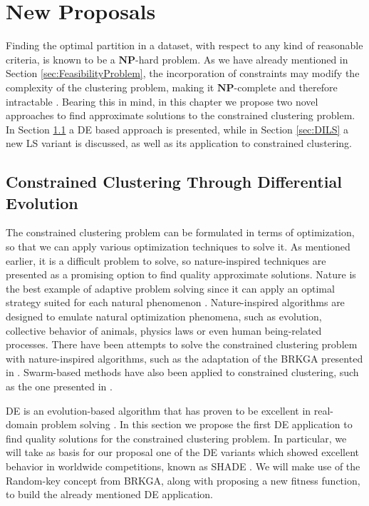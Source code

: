 \chapter{New Proposals}\label{ch:NewProposals}

Finding the optimal partition in a dataset, with respect to any kind of reasonable criteria, is known to be a $\mathbf{NP}$-hard problem. As we have already mentioned in Section \ref{sec:FeasibilityProblem}, the incorporation of constraints may modify the complexity of the clustering problem, making it $\mathbf{NP}$-complete and therefore intractable \cite{davidson2005clustering}. Bearing this in mind, in this chapter we propose two novel approaches to find approximate solutions to the constrained clustering problem. In Section \ref{sec:CCSHADE} a \acf{DE} based approach is presented, while in Section \ref{sec:DILS} a new \acf{LS} variant is discussed, as well as its application to constrained clustering.


\section{Constrained Clustering Through Differential Evolution} \label{sec:CCSHADE}

The constrained clustering problem can be formulated in terms of optimization, so that we can apply various optimization techniques to solve it. As mentioned earlier, it is a difficult problem to solve, so nature-inspired techniques are presented as a promising option to find quality approximate solutions. Nature is the best example of adaptive problem solving since it can apply an optimal strategy suited for each natural phenomenon \cite{fausto2019ants}. Nature-inspired algorithms are designed to emulate natural optimization phenomena, such as evolution, collective behavior of animals, physics laws or even human being-related processes. There have been attempts to solve the constrained clustering problem with nature-inspired algorithms, such as the adaptation of the \acf{BRKGA} presented in \cite{de2017comparison}. Swarm-based methods have also been applied to constrained clustering, such as the one presented in \cite{xu2013improving}.

\acs{DE} is an evolution-based algorithm that has proven to be excellent in real-domain problem solving \cite{das2011differential}. In this section we propose the first \acs{DE} application to find quality solutions for the constrained clustering problem. In particular, we will take as basis for our proposal one of the \acs{DE} variants which showed excellent behavior in worldwide competitions, known as SHADE \cite{molina2018insight}. We will make use of the Random-key concept from \acs{BRKGA}, along with proposing a new fitness function, to build the already mentioned \acs{DE} application.

